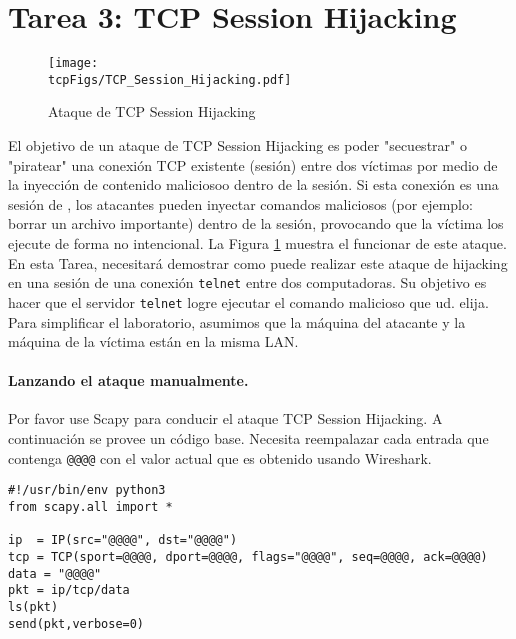             


\section{Tarea 3: TCP Session Hijacking}



\begin{figure}[htb]
  \begin{center}
    \texttt{[image: \\tcpFigs/TCP\_Session\_Hijacking.pdf]}
  \end{center}
  \caption{Ataque de TCP Session Hijacking}
  \label{tcp:fig:hijacking}
\end{figure}
 
El objetivo de un ataque de TCP Session Hijacking es poder "secuestrar" o "piratear" una conexión TCP existente (sesión) entre dos víctimas por medio de la inyección de contenido maliciosoo dentro de la sesión. Si esta conexión es una sesión de \telnet, los atacantes pueden inyectar comandos maliciosos (por ejemplo: borrar un archivo importante) dentro de la sesión, provocando que la víctima los ejecute de forma no intencional. La Figura \ref{tcp:fig:hijacking} muestra el funcionar de este ataque.
En esta Tarea, necesitará demostrar como puede realizar este ataque de hijacking en una sesión de una conexión \texttt{telnet} entre dos computadoras. Su objetivo es hacer que el servidor \texttt{telnet} logre ejecutar el comando malicioso que ud. elija.
Para simplificar el laboratorio, asumimos que la máquina del atacante y la máquina de la víctima están en la misma LAN.


\paragraph{Lanzando el ataque manualmente.}
Por favor use Scapy para conducir el ataque TCP Session Hijacking.
A continuación se provee un código base. Necesita reempalazar cada entrada que contenga \texttt{@@@@} con el valor actual que es obtenido usando Wireshark.

\begin{lstlisting}
#!/usr/bin/env python3
from scapy.all import *

ip  = IP(src="@@@@", dst="@@@@")
tcp = TCP(sport=@@@@, dport=@@@@, flags="@@@@", seq=@@@@, ack=@@@@)
data = "@@@@"
pkt = ip/tcp/data
ls(pkt)
send(pkt,verbose=0)
\end{lstlisting}


